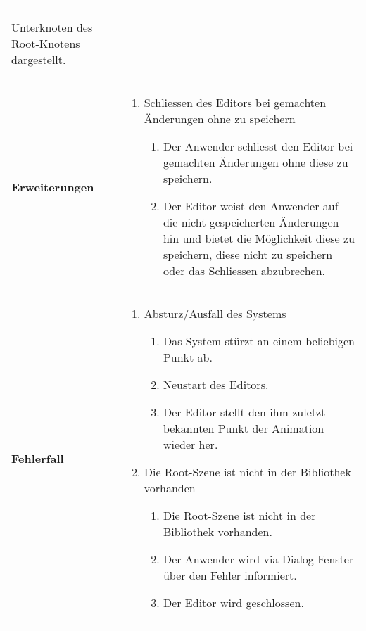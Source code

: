 \begin{longtabu}{p{0.5\textwidth}p{0.5\textwidth}}
\begin{enumerate}
{                    Unterknoten des Root-Knotens dargestellt.}
        \end{enumerate} \\
    \cmidrule(r){1-1}\cmidrule(lr){2-2}
        \textbf{Erweiterungen} &
        \begin{enumerate}[label= (\alph*)]
            \item{Schliessen des Editors bei gemachten Änderungen ohne zu
                    speichern
                \begin{enumerate}[label= (\roman*)]
                    \item{Der Anwender schliesst den Editor bei gemachten
                            Änderungen ohne diese zu speichern.}
                    \item{Der Editor weist den Anwender auf die
                            nicht gespeicherten Änderungen hin und bietet
                            die Möglichkeit diese zu speichern, diese nicht
                            zu speichern oder das Schliessen abzubrechen.}
                \end{enumerate}
            }
        \end{enumerate} \\
    \cmidrule(r){1-1}\cmidrule(lr){2-2}
    \textbf{Fehlerfall} &
        \begin{enumerate}
            \item{Absturz/Ausfall des Systems
                \begin{enumerate}[label= (\roman*)]
                        \item{Das System stürzt an einem beliebigen Punkt
                                ab.}
                        \item{Neustart des Editors.}
                        \item{Der Editor stellt den ihm zuletzt bekannten
                                Punkt der Animation wieder her.}
                \end{enumerate}
            }
            \item{Die Root-Szene ist nicht in der Bibliothek vorhanden
                \begin{enumerate}[label= (\roman*)]
                    \item{Die Root-Szene ist nicht in der Bibliothek vorhanden.}
                    \item{Der Anwender wird via Dialog-Fenster über den Fehler
                            informiert.}
                    \item{Der Editor wird geschlossen.}

\end{enumerate}}
\end{enumerate}
\end{longtabu}
